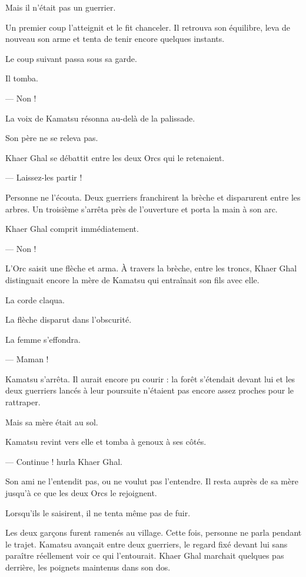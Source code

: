 Mais il n'était pas un guerrier.

Un premier coup l'atteignit et le fit chanceler. Il retrouva son équilibre,
leva de nouveau son arme et tenta de tenir encore quelques instants.

Le coup suivant passa sous sa garde.

Il tomba.

— Non !

La voix de Kamatsu résonna au-delà de la palissade.

Son père ne se releva pas.

Khaer Ghal se débattit entre les deux Orcs qui le retenaient.

— Laissez-les partir !

Personne ne l'écouta. Deux guerriers franchirent la brèche et disparurent entre
les arbres. Un troisième s'arrêta près de l'ouverture et porta la main à son
arc.

Khaer Ghal comprit immédiatement.

— Non !

L'Orc saisit une flèche et arma. À travers la brèche, entre les troncs, Khaer
Ghal distinguait encore la mère de Kamatsu qui entraînait son fils avec elle.

La corde claqua.

La flèche disparut dans l'obscurité.

La femme s'effondra.

— Maman !

Kamatsu s'arrêta. Il aurait encore pu courir : la forêt s'étendait devant lui
et les deux guerriers lancés à leur poursuite n'étaient pas encore assez
proches pour le rattraper.

Mais sa mère était au sol.

Kamatsu revint vers elle et tomba à genoux à ses côtés.

— Continue ! hurla Khaer Ghal.

Son ami ne l'entendit pas, ou ne voulut pas l'entendre. Il resta auprès de sa
mère jusqu'à ce que les deux Orcs le rejoignent.

Lorsqu'ils le saisirent, il ne tenta même pas de fuir.

\scenebreak

Les deux garçons furent ramenés au village. Cette fois, personne ne parla
pendant le trajet. Kamatsu avançait entre deux guerriers, le regard fixé devant
lui sans paraître réellement voir ce qui l'entourait. Khaer Ghal marchait
quelques pas derrière, les poignets maintenus dans son dos.

